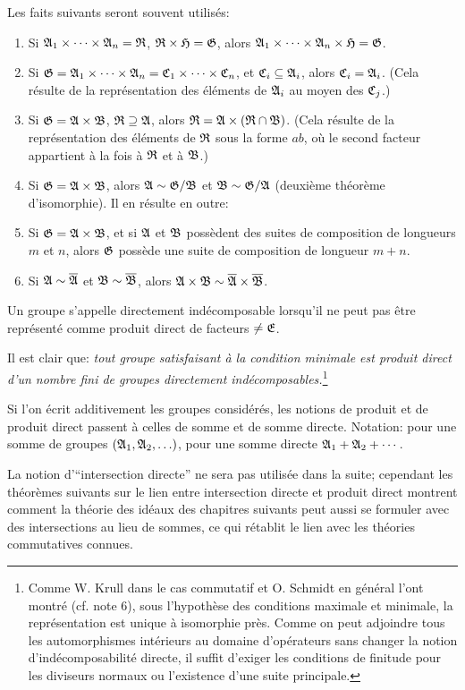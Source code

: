 Les faits suivants seront souvent utilisés:
\begin{enumerate}
\item Si $\mathfrak{A}_1\times\cdots\times\mathfrak{A}_n=\mathfrak{R}$, $\mathfrak{R}\times\mathfrak{H}=\mathfrak{G}$, alors $\mathfrak{A}_1\times\cdots\times\mathfrak{A}_n\times\mathfrak{H}=\mathfrak{G}$.
\item Si $\mathfrak{G}=\mathfrak{A}_1\times\cdots\times\mathfrak{A}_n=\mathfrak{C}_1\times\cdots\times\mathfrak{C}_n$, et $\mathfrak{C}_i\subseteq\mathfrak{A}_i$, alors $\mathfrak{C}_i=\mathfrak{A}_i$. (Cela résulte de la représentation des éléments de $\mathfrak{A}_i$ au moyen des $\mathfrak{C}_j$.)
\item Si $\mathfrak{G}=\mathfrak{A}\times\mathfrak{B}$, $\mathfrak{R}\supseteq\mathfrak{A}$, alors $\mathfrak{R}=\mathfrak{A}\times(\mathfrak{R}\cap\mathfrak{B})$. (Cela résulte de la représentation des éléments de $\mathfrak{R}$ sous la forme $ab$, où le second facteur appartient à la fois à $\mathfrak{R}$ et à $\mathfrak{B}$.)
\item Si $\mathfrak{G}=\mathfrak{A}\times\mathfrak{B}$, alors $\mathfrak{A}\sim\mathfrak{G}/\mathfrak{B}$ et $\mathfrak{B}\sim\mathfrak{G}/\mathfrak{A}$ (deuxième théorème d'isomorphie). Il en résulte en outre:
\item Si $\mathfrak{G}=\mathfrak{A}\times\mathfrak{B}$, et si $\mathfrak{A}$ et $\mathfrak{B}$ possèdent des suites de composition de longueurs $m$ et $n$, alors $\mathfrak{G}$ possède une suite de composition de longueur $m+n$.
\item Si $\mathfrak{A}\sim\overline{\mathfrak{A}}$ et $\mathfrak{B}\sim\overline{\mathfrak{B}}$, alors $\mathfrak{A}\times\mathfrak{B}\sim\overline{\mathfrak{A}}\times\overline{\mathfrak{B}}$.
\end{enumerate}
Un groupe s'appelle directement indécomposable lorsqu'il ne peut pas être représenté comme produit direct de facteurs $\ne\mathfrak{E}$.

Il est clair que: \emph{tout groupe satisfaisant à la condition minimale est produit direct d'un nombre fini de groupes directement indécomposables.}\footnote{Comme W. Krull dans le cas commutatif et O. Schmidt en général l'ont montré (cf. note 6), sous l'hypothèse des conditions maximale et minimale, la représentation est unique à isomorphie près. Comme on peut adjoindre tous les automorphismes intérieurs au domaine d'opérateurs sans changer la notion d'indécomposabilité directe, il suffit d'exiger les conditions de finitude pour les diviseurs normaux ou l'existence d'une suite principale.}

Si l'on écrit additivement les groupes considérés, les notions de produit et de produit direct passent à celles de somme et de somme directe. Notation: pour une somme de groupes $(\mathfrak{A}_1,\mathfrak{A}_2,\ldots)$, pour une somme directe $\mathfrak{A}_1+\mathfrak{A}_2+\cdots$.

La notion d'``intersection directe'' ne sera pas utilisée dans la suite; cependant les théorèmes suivants sur le lien entre intersection directe et produit direct montrent comment la théorie des idéaux des chapitres suivants peut aussi se formuler avec des intersections au lieu de sommes, ce qui rétablit le lien avec les théories commutatives connues.

